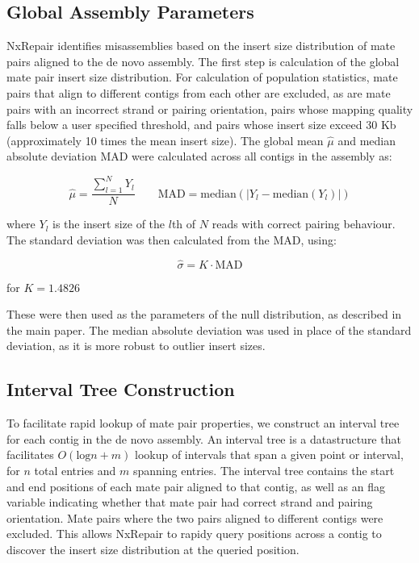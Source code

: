 \documentclass[fleqn,10pt]{wlpeerj}
\begin{document}
\subsection*{Global Assembly Parameters}
NxRepair identifies misassemblies based on the insert size distribution of mate pairs aligned to the de novo assembly. The first step is calculation of the global mate pair insert size distribution. For calculation of population statistics, mate pairs that align to different contigs from each other are excluded, as are mate pairs with an incorrect strand or pairing orientation, pairs whose mapping quality falls below a user specified threshold, and pairs whose insert size exceed 30 Kb (approximately 10 times the mean insert size). The global mean $\hat{\mu}$ and median absolute deviation $\text{MAD}$ were calculated across all contigs in the assembly as:

\begin{equation}
\hat{\mu} = \frac{\sum_{l=1}^N Y_l}{N} \qquad \text{MAD} = \text{median}(|Y_l - \text{median}(Y_l)|)
\label{eq:global}
\end{equation}

where $Y_l$ is the insert size of the $l$th of $N$ reads with correct pairing behaviour. The standard deviation was then calculated from the MAD, using:

\begin{equation}
\hat{\sigma} = K \cdot \text{MAD}
\label{eq:mad_to_sigma}
\end{equation}

for $K = 1.4826$

These were then used as the parameters of the null distribution, as described in the main paper. The median absolute deviation was used in place of the standard deviation, as it is more robust to outlier insert sizes.

\subsection*{Interval Tree Construction}
To facilitate rapid lookup of mate pair properties, we construct an interval tree~\citep{cormen2009} for each contig in the de novo assembly. An interval tree is a datastructure that facilitates $O(\text{log} n + m)$ lookup of intervals that span a given point or interval, for $n$ total entries and $m$ spanning entries. The interval tree contains the start and end positions of each mate pair aligned to that contig, as well as an flag variable indicating whether that mate pair had correct strand and pairing orientation. Mate pairs where the two pairs aligned to different contigs were excluded. This allows NxRepair to rapidy query positions across a contig to discover the insert size distribution at the queried position.  
\end{document}
